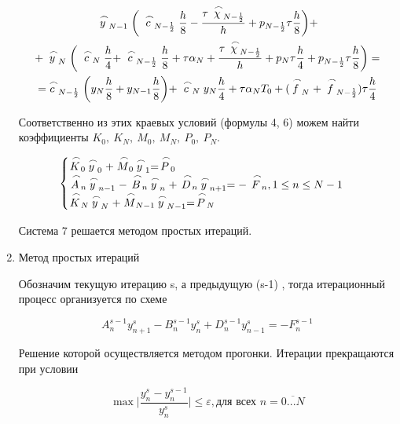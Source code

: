 \documentclass[a4paper,14pt]{extreport} %
\begin{document}
\begin{enumerate}
\begin{multline}
\buildrel\,\,\frown\over{y}_{N-1}\bigg(\buildrel\,\,\frown\over{c}_{N-\frac{1}{2}}\frac{h}{8}  - \frac{\tau\buildrel\,\,\frown\over{\chi}_{N-\frac{1}{2}}}{h} + p_{N-\frac{1}{2}}\tau\frac{h}{8}  \bigg)+\\
+ \buildrel\,\,\frown\over{y}_N\bigg( \buildrel\,\,\frown\over{c}_{N}\frac{h}{4} + \buildrel\,\,\frown\over{c}_{N-\frac{1}{2}}\frac{h}{8} + \tau\alpha_N +\frac{ \tau\buildrel\,\,\frown\over{\chi}_{N-\frac{1}{2}}}{h} +p_N\tau\frac{h}{4}+p_{N-\frac{1}{2}}\tau\frac{h}{8} \bigg)=\\
=\buildrel\,\,\frown\over{c}_{N-\frac{1}{2}}\bigg({y}_{N}\frac{h}{8}+{y}_{N-1}\frac{h}{8} \bigg) + \buildrel\,\,\frown\over{c}_{N}y_N\frac{h}{4}+\tau\alpha_NT_0+(\buildrel\,\,\frown\over{f}_N+\buildrel\,\,\frown\over{f}_{N-\frac{1}{2}})\tau \frac{h}{4}
\end{multline}

Соответственно из этих краевых условий (формулы 4, 6) можем найти коэффициенты $K_0,~K_N,~M_0,~M_N,~P_0,~P_N$. 

\begin{equation}
\begin{cases}
\buildrel\,\,\frown\over{K}_0\buildrel\,\,\frown\over{y}_0+\buildrel\,\,\frown\over{M}_0\buildrel\,\,\frown\over{y}_1=\buildrel\,\,\frown\over{P}_0\\
\buildrel\,\,\frown\over{A}_n\buildrel\,\,\frown\over{y}_{n-1}-\buildrel\,\,\frown\over{B}_n\buildrel\,\,\frown\over{y}_n+\buildrel\,\,\frown\over{D}_n\buildrel\,\,\frown\over{y}_{n+1}=-\buildrel\,\,\frown\over{F}_n, 1\le n\le N-1\\
\buildrel\,\,\frown\over{K}_N\buildrel\,\,\frown\over{y}_N+\buildrel\,\,\frown\over{M}_{N-1}\buildrel\,\,\frown\over{y}_{N-1}=\buildrel\,\,\frown\over{P}_N\\
\end{cases}
\end{equation}

Система 7 решается методом простых итераций. 

\item Метод простых итераций

Обозначим текущую итерацию s, а предыдущую (s-1) , тогда итерационный процесс организуется по схеме

\begin{equation}
{A}_n^{s-1}{y}_{n+1}^{s}-{B}_n^{s-1}{y}_n^{s}+{D}^{s-1}_n{y}_{n-1}^{s}=-{F}^{s-1}_n
\end{equation}

Решение которой осуществляется методом прогонки. Итерации прекращаются при условии

\begin{equation*}
\max\bigg|\frac{y^s_n-y^{s-1}_n}{y^s_n}\bigg|\le\varepsilon, \text{для всех } n=\overline{0 ... N}
\end{equation*}

\end{enumerate}
\end{document}
